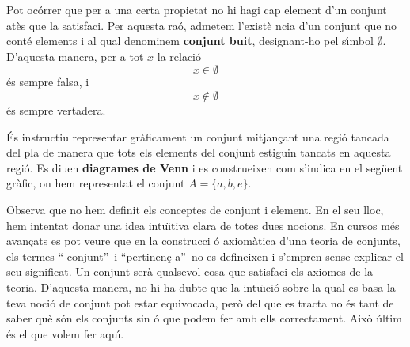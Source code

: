 Pot oc\'{o}rrer que per a una certa propietat no hi hagi cap element d'un
conjunt at\`{e}s que la satisfaci. Per aquesta ra\'{o}, admetem l'exist\`{e}%
ncia d'un conjunt que no cont\'{e} elements i al qual denominem \textbf{%
conjunt buit}, designant-ho pel s\'{\i}mbol $\emptyset$. D'aquesta manera,
per a tot $x$ la relaci\'{o}%
\begin{equation*}
x\in\emptyset
\end{equation*}
\'{e}s sempre falsa, i%
\begin{equation*}
x\notin\emptyset
\end{equation*}
\'{e}s sempre vertadera.

\bigskip

\'{E}s instructiu representar gr\`{a}ficament un conjunt mitjan\c{c}ant una
regi\'{o} tancada del pla de manera que tots els elements del conjunt
estiguin tancats en aquesta regi\'{o}. Es diuen \textbf{diagrames de Venn} i
es construeixen com s'indica en el seg\"{u}ent gr\`{a}fic, on hem
representat el conjunt $A=\{a,b,e\}$.

\begin{observacio}
Observa que no hem definit els conceptes de conjunt i element. En el seu
lloc, hem intentat donar una idea intu\"{\i}tiva clara de totes dues
nocions. En cursos m\'{e}s avan\c{c}ats es pot veure que en la construcci%
\'{o} axiom\`{a}tica d'una teoria de conjunts, els termes \textquotedblleft
conjunt\textquotedblright\ i \textquotedblleft pertinen\c{c}%
a\textquotedblright\ no es defineixen i s'empren sense explicar el seu
significat. Un conjunt ser\`{a} qualsevol cosa que satisfaci els axiomes de
la teoria. D'aquesta manera, no hi ha dubte que la intu\"{\i}ci\'{o} sobre
la qual es basa la teva noci\'{o} de conjunt pot estar equivocada, per\`{o}
del que es tracta no \'{e}s tant de saber qu\`{e} s\'{o}n els conjunts sin%
\'{o} que podem fer amb ells correctament. Aix\`{o} \'{u}ltim \'{e}s el que
volem fer aqu\'{\i}.
\end{observacio}

